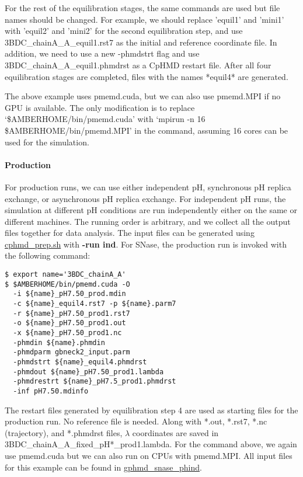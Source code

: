 For the rest of the equilibration stages, 
the same commands are used
but file names should be changed. For example, we should replace 'equil1' and 'mini1' with 'equil2' and 'mini2' for the second equilibration step, and use 3BDC\_chainA\_A\_equil1.rst7 as the initial and reference coordinate file. 
In addition, we need to use a new -phmdstrt flag and use 3BDC\_chainA\_A\_equil1.phmdrst as a CpHMD restart file. 
After all four equilibration stages are completed,
files with the names *equil4* are generated.

The above example uses pmemd.cuda, but we can also use pmemd.MPI if no GPU is available. The only modification is to replace
`\$AMBERHOME/bin/pmemd.cuda' with `mpirun -n 16 \$AMBERHOME/bin/pmemd.MPI' in the command, assuming 16 cores can be used for the simulation.



\paragraph{Production}
For production runs, we can use either independent pH, 
synchronous pH replica exchange, or asynchronous pH replica exchange.
For independent pH runs, the simulation at different pH 
conditions are run independently either on the same or different machines. 
The running order is arbitrary, and we collect all the output files together for data analysis. 
The input files can be generated using 
\href{https://gitlab.com/shenlab-amber-cphmd/cphmd-prep/-/tree/master/cphmd_tools/cphmd_prep.sh}{cphmd\_prep.sh}
with \textbf{-run ind}.
For SNase, the production run 
is invoked with the following command:
\begin{lstlisting}
$ export name='3BDC_chainA_A'
$ $AMBERHOME/bin/pmemd.cuda -O
  -i ${name}_pH7.50_prod.mdin
  -c ${name}_equil4.rst7 -p ${name}.parm7
  -r ${name}_pH7.50_prod1.rst7
  -o ${name}_pH7.50_prod1.out
  -x ${name}_pH7.50_prod1.nc
  -phmdin ${name}.phmdin
  -phmdparm gbneck2_input.parm
  -phmdstrt ${name}_equil4.phmdrst
  -phmdout ${name}_pH7.50_prod1.lambda
  -phmdrestrt ${name}_pH7.5_prod1.phmdrst
  -inf pH7.50.mdinfo
\end{lstlisting}
The restart files generated by equilibration step 4 are used as starting files for the production run. No reference file is needed. 
Along with *.out, *.rst7, *.nc (trajectory), 
and *.phmdrst files, 
$\lambda$ coordinates are saved in 3BDC\_chainA\_A\_fixed\_pH*\_prod1.lambda. 
For the command above, we again use pmemd.cuda
but we can also run on CPUs with pmemd.MPI.
All input files for this example can be found in \href{https://gitlab.com/shenlab-amber-cphmd/cphmd-tutorial/-/tree/main/gphmd_Amber/gphmd_snase_phind}{gphmd\_snase\_phind}.

